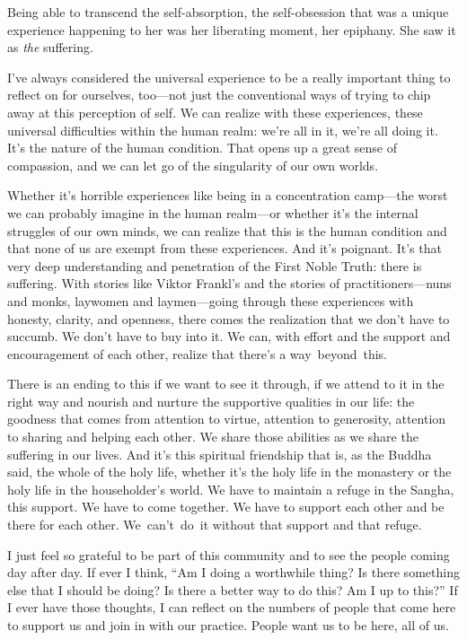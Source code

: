 Being able to transcend the self-absorption, the self-obsession that was a unique experience happening to her was her liberating moment, her epiphany. She saw it as \emph{the} suffering.

I've always considered the universal experience to be a really important thing to reflect on for ourselves, too---not just the conventional ways of trying to chip away at this perception of self. We can realize with these experiences, these universal difficulties within the human realm: we're all in it, we're all doing it. It's the nature of the human condition. That opens up a great sense of compassion, and we can let go of the singularity of our own worlds.

Whether it's horrible experiences like being in a concentration camp---the worst we can probably imagine in the human realm---or whether it's the internal struggles of our own minds, we can realize that this is the human condition and that none of us are exempt from these experiences. And it's poignant. It's that very deep understanding and penetration of the First Noble Truth: there is suffering. With stories like Viktor Frankl's and the stories of practitioners---nuns and monks, laywomen and laymen---going through these experiences with honesty, clarity, and openness, there comes the realization that we don't have to succumb. We don't have to buy into it. We can, with effort and the support and encouragement of each other, realize that there's a \mbox{way beyond this.}

There is an ending to this if we want to see it through, if we attend to it in the right way and nourish and nurture the supportive qualities in our life: the goodness that comes from attention to virtue, attention to generosity, attention to sharing and helping each other. We share those abilities as we share the suffering in our lives. And it's this spiritual friendship that is, as the Buddha said, the whole of the holy life, whether it's the holy life in the monastery or the holy life in the householder's world. We have to maintain a refuge in the Sangha, this support. We have to come together. We have to support each other and be there for each other. \mbox{We can't do it} without that support and that refuge.

I just feel so grateful to be part of this community and to see the people coming day after day. If ever I think, ``Am I doing a worthwhile thing? Is there something else that I should be doing? Is there a better way to do this? Am I up to this?'' If I ever have those thoughts, I can reflect on the numbers of people that come here to support us and join in with our practice. People want us to be here, all of us.

